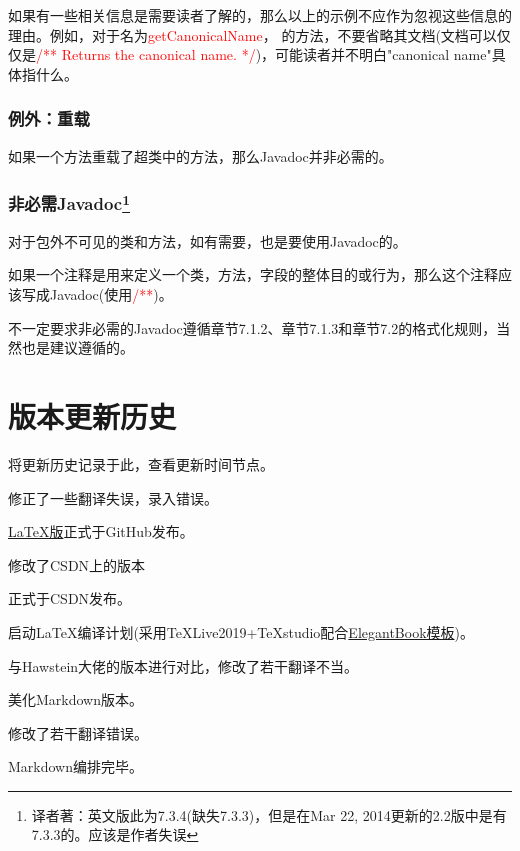 \documentclass[cn,11pt,chinese]{elegantbook}
\begin{document}
\begin{note}
	如果有一些相关信息是需要读者了解的，那么以上的示例不应作为忽视这些信息的理由。例如，对于名为\textcolor{red}{getCanonicalName}， 的方法，不要省略其文档(文档可以仅仅是\textcolor{red}{/** Returns the canonical name. */})，可能读者并不明白"canonical name"具体指什么。
\end{note}

\subsection{例外：重载}
如果一个方法重载了超类中的方法，那么Javadoc并非必需的。

\subsection{非必需Javadoc\footnote{译者著：英文版此为7.3.4(缺失7.3.3)，但是在Mar 22, 2014更新的2.2版中是有7.3.3的。应该是作者失误}}
对于包外不可见的类和方法，如有需要，也是要使用Javadoc的。

如果一个注释是用来定义一个类，方法，字段的整体目的或行为，那么这个注释应该写成Javadoc(使用\textcolor{red}{/**})。

不一定要求非必需的Javadoc遵循章节7.1.2、章节7.1.3和章节7.2的格式化规则，当然也是建议遵循的。

\chapter{版本更新历史}
将更新历史记录于此，查看更新时间节点。

\begin{change}
	\item 修正了一些翻译失误，录入错误。
	\item \href{https://github.com/TYZQ/Google-Java-Style-Guide-cn}{\LaTeX 版}正式于GitHub发布。
	\item 修改了CSDN上的版本

\end{change}

\begin{change}
	\item 正式于CSDN发布。
	\item 启动\LaTeX 编译计划(采用\TeX Live2019+\TeX studio配合\href{https://github.com/ElegantLaTeX/ElegantBook}{ElegantBook模板})。
\end{change}

\begin{change}
	\item 与Hawstein大佬的版本进行对比，修改了若干翻译不当。
	\item 美化Markdown版本。
\end{change}

\begin{change}
	\item 修改了若干翻译错误。
	\item Markdown编排完毕。
\end{change}




\end{document}
